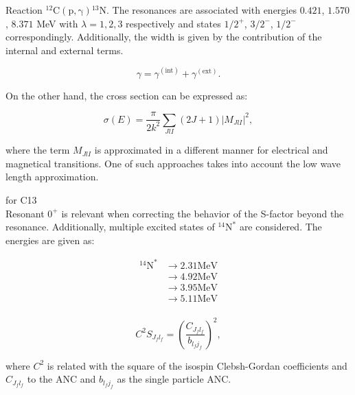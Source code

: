 \documentclass[openany]{book}
\begin{document}
Reaction $\mathrm{{}^{12}C(p, \gamma){}^{13}N }$. The resonances are associated with energies $0.421$, $1.570$, $8.371$ MeV with $\lambda = 1, 2, 3$ respectively and states $1/2^{+}$, $3/2^{-}$, $1/2^{-}$ correspondingly. Additionally,  the width is given by the contribution of the internal and external terms.

\begin{equation}\label{eq:rmatrix_width_internalExternal}
	\gamma = \gamma^{(\mathrm{int})} + \gamma^{(\mathrm{ext})}.
\end{equation}

On the other hand, the cross section can be expressed as: 

\begin{equation}\label{eq:rmatrix_crossSection_m}
	\sigma(E) = \frac{\pi}{2k^2} \sum_{JlI} (2J + 1) |M_{JlI}|^2,
\end{equation}

where the term $M_{JlI}$ is approximated in a different manner for electrical and magnetical transitions. One of such approaches takes into account the low wave length approximation. 




 \cite{chakraborty_deboer_mukherjee_roy_2015} for C13 \\

Resonant $0^{+}$ is relevant when correcting the behavior of the S-factor beyond the resonance. Additionally, multiple excited states of $\mathrm{{}^{14}N^{*}}$ are considered. The energies are given as: 

\begin{equation}\label{eq:rmatrix_excited_14N}
	\begin{split}
		\mathrm{{}^{14}N^{*}} & \rightarrow 2.31\mathrm{MeV} \\
											& \rightarrow 4.92\mathrm{MeV} \\
											& \rightarrow 3.95\mathrm{MeV} \\
											& \rightarrow 5.11\mathrm{MeV} \\
	\end{split}
\end{equation}
 

\begin{equation}\label{eq:rmatrix_spectroscopic_parametrization}
	C^2S_{J_f l_f} =  \left (\frac{C_{J_fl_f}}{b_{l_fj_f}} \right)^2,
\end{equation}

where $C^2$ is related with the square of the isospin Clebsh-Gordan coefficients and $C_{J_fl_f}$ to the ANC and $b_{l_fj_f}$ as the single particle ANC.
\end{document}
